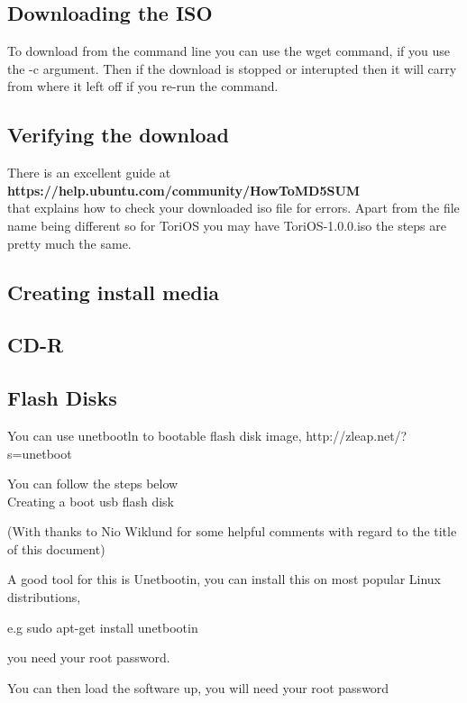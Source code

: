 \documentclass[12pt,a4paper]{book}
\begin{document}
\subsection{Downloading the ISO}
To download from the command line you can use the wget command, if you use the -c argument.  Then if the download is stopped or interupted then it will carry from where it left off if you re-run the command.\\



\subsection{Verifying the download}
There is an excellent guide at\\ \textbf{https://help.ubuntu.com/community/HowToMD5SUM} \\
that explains how to check your downloaded iso file for errors.  Apart from the file name being different so for ToriOS you may have ToriOS-1.0.0.iso the steps are pretty much the same.  
\subsection{Creating install media}

\subsection{CD-R}


\subsection{Flash Disks}

You can use unetbootln to bootable flash disk image,   http://zleap.net/?s=unetboot

You can follow the steps below \\

Creating a boot usb flash disk

(With thanks to Nio Wiklund for some helpful comments with regard to the title of this document)

A good tool for this is Unetbootin,  you can install this on most popular Linux distributions,

e.g sudo apt-get install unetbootin

you need your root password.

You can then load the software up, you will need your root password
\end{document}
